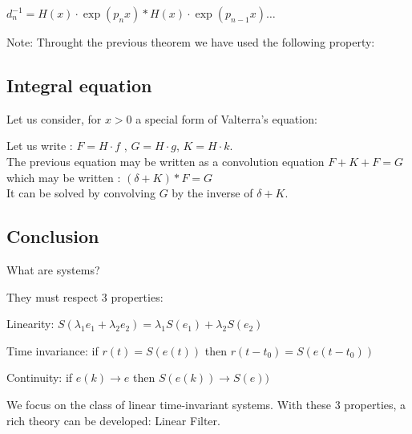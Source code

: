 \documentclass[11pt, openright]{book}
\begin{document}
$d_{n}^{-1}=H(x)\cdot \exp(p_nx)*H(x)\cdot \exp(p_{n-1}x)\ldots$

\begin{dent}{Note: }
    Throught the previous theorem we have used the following property:
\end{dent}

\subsection{Integral equation}

Let us consider, for $x>0$ a special form of Valterra's equation:


Let us write : $F=H\cdot f$ , $G=H\cdot g$, $K=H\cdot k$.\\
The previous equation may be written as a convolution equation $F+K+F=G$ which may be written : $(\delta +K)*F=G$\\
It can be solved by convolving $G$ by the inverse of $\delta +K$.

\subsection{Conclusion}
What are systems?\\


They must respect 3 properties:
\begin{items}{-15pt}{-15pt}
    \item Linearity: $S(\lambda_1e_1+\lambda_2e_2)=\lambda_1S(e_1)+\lambda_2S(e_2)$
    \item Time invariance: if $r(t)=S(e(t))$ then $r(t-t_0)=S(e(t-t_0))$
    \item Continuity: if $e(k)\to e$ then $S(e(k))\to S(e))$
\end{items}

We focus on the class of linear time-invariant systems. With these 3 properties, a rich theory can be developed: Linear Filter.
\end{document}
